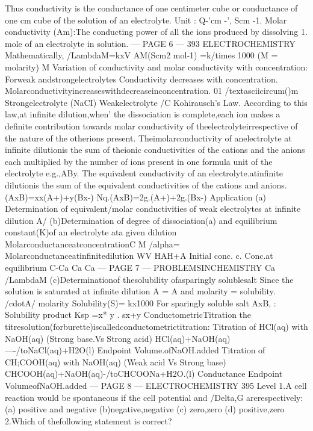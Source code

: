 \begin{problembox}
Thus conductivity is the conductance of one centimeter cube or conductance of one cm
cube of the solution of an electrolyte.
Unit : Q-'cm -', Scm -1.
Molar conductivity (Am):The conducting power of all the ions produced by dissolving 1.
mole of an electrolyte in solution.
--- PAGE 6 ---
393
ELECTROCHEMISTRY
Mathematically, /LambdaM=kxV
AM(Scm2 mol-1) =k/times 1000
(M = molarity)
M
Variation of conductivity and molar conductivity with concentration:
Forweak andstrongelectrolytes
Conductivity decreases with concentration.
Molarconductivityincreaseswithdecreaseinconcentration.
01
/textasciicircum()m
Strongelectrolyte
(NaCI)
Weakelectrolyte
/C
Kohirausch's Law.
According to this law,at infinite dilution,when' the dissociation is complete,each ion makes a
definite contribution towards molar conductivity of theelectrolyteirrespective of the nature of the
otherions present.
Theimolarconductivity of anelectrolyte at infinite dilutionis the sum of theionic conductivities
of the cations and the anions each multiplied by the number of ions present in one formula unit of
the electrolyte e.g.,ABy.
The equivalent conductivity of an electrolyte.atinfinite dilutionis the sum of the equivalent
conductivities of the cations and anions.
(AxB)=xx(A+)+y(Bx-)
Nq.(AxB)=2g.(A+)+2g.(Bx-)
Application
(a) Determination of equivalent/molar conductivities of weak electrolytes at
infinite dilution
A/%
(b)Determination of degree of dissociation(a) and equilibrium constant(K)of
an electrolyte ata given dilution
MolarconductanceatconcentrationC
M
/alpha=
Molarconductanceatinfinitedilution
WV
HAH+A
Initial conc.
c.
Conc.at equilibrium C-Ca
Ca
Ca
--- PAGE 7 ---
PROBLEMSINCHEMISTRY
Ca
/LambdaM
(c)Determinationof thesolubility ofasparingly solublesalt
Since the solution is saturated at infinite dilution A = A and molarity = solubility.
/cdotA/%
molarity
Solubility(S)=
kx1000
For sparingly soluble salt AxB, : Solubility product Ksp =x* y . sx+y
ConductometricTitration
the titresolution(forburette)iscalledconductometrictitration:
Titration of HCl(aq) with NaOH(aq) (Strong base.Vs Strong acid)
HCl(aq)+NaOH(aq)----/toNaCl(aq)+H2O(l)
Endpoint
Volume.ofNaOH.added
Titration of CH;COOH(aq) with NaOH(aq) (Weak acid Vs Strong base)
CHCOOH(aq)+NaOH(aq)-/toCHCOONa+H2O.(l)
Conductance
Endpoint
VolumeofNaOH.added
--- PAGE 8 ---
ELECTROCHEMISTRY
395
Level
1.A cell reaction would be spontaneous if the cell potential and /Delta,G arerespectively:
(a) positive and negative
(b)negative,negative
(c) zero,zero
(d) positive,zero
2.Which of thefollowing statement is correct?

\end{problembox}
